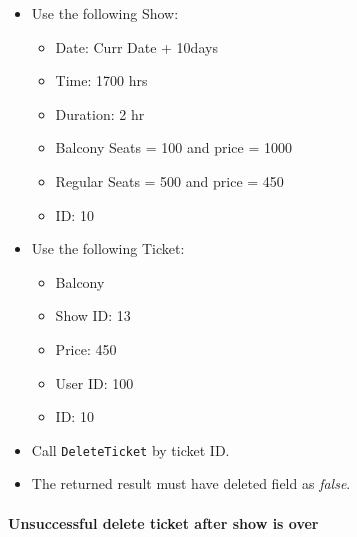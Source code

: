 \documentclass[]{article}
\providecommand{\tightlist}{%
  \setlength{\itemsep}{0pt}\setlength{\parskip}{0pt}}
\let\oldparagraph\paragraph
\renewcommand{\paragraph}[1]{\oldparagraph{#1}\mbox{}}
\begin{document}
\begin{itemize}
\tightlist
\item
  Use the following Show:

  \begin{itemize}
  \tightlist
  \item
    Date: Curr Date + 10days
  \item
    Time: 1700 hrs
  \item
    Duration: 2 hr
  \item
    Balcony Seats = 100 and price = 1000
  \item
    Regular Seats = 500 and price = 450
  \item
    ID: 10
  \end{itemize}
\item
  Use the following Ticket:

  \begin{itemize}
  \tightlist
  \item
    Balcony
  \item
    Show ID: 13
  \item
    Price: 450
  \item
    User ID: 100
  \item
    ID: 10
  \end{itemize}
\item
  Call \texttt{DeleteTicket} by ticket ID.
\item
  The returned result must have deleted field as \emph{false}.
\end{itemize}

\hypertarget{unsuccessful-delete-ticket-after-show-is-over}{%
\paragraph{Unsuccessful delete ticket after show is
over}\label{unsuccessful-delete-ticket-after-show-is-over}}
\end{document}
